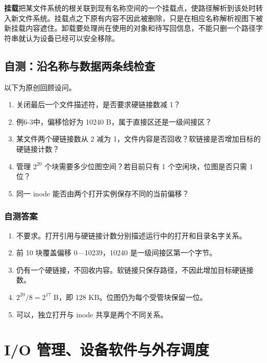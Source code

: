 \textbf{挂载}把某文件系统的根关联到现有名称空间的一个挂载点，使路径解析到该处时转入新文件系统。挂载点之下原有内容不因此被删除，只是在相应名称解析视图下被新挂载内容遮住。卸载要处理尚在使用的对象和待写回信息，不能只删一个路径字符串就认为设备已经可以安全移除。

\section{自测：沿名称与数据两条线检查}\label{os-6-review}

以下为原创回顾设问。

\begin{enumerate}
\def\labelenumi{\arabic{enumi}.}
\tightlist
\item
  关闭最后一个文件描述符，是否要求硬链接数减 1？
\item
  例6-3中，偏移恰好为 10240 B，属于直接区还是一级间接区？
\item
  某文件两个硬链接数从 2 减为 1，文件内容是否回收？软链接是否增加目标的硬链接计数？
\item
  管理 \(2^{20}\) 个块需要多少位图空间？若目前只有 1 个空闲块，位图是否只需 1 位？
\item
  同一 inode 能否由两个打开实例保存不同的当前偏移？
\end{enumerate}

\subsection{自测答案}\label{os-c06-h186}

\begin{enumerate}
\def\labelenumi{\arabic{enumi}.}
\tightlist
\item
  不要求。打开引用与硬链接计数分别描述运行中的打开和目录名字关系。
\item
  前 10 块覆盖偏移 0---10239，10240 是一级间接区第一个字节。
\item
  仍有一个硬链接，不回收内容。软链接只保存路径，不因此增加目标硬链接数。
\item
  \(2^{20}/8=2^{17}\) B，即 128 KB。位图仍为每个受管块保留一位。
\item
  可以，独立打开与 inode 共享是两个不同关系。
\end{enumerate}

\chapter{I/O 管理、设备软件与外存调度}\label{os-ch7}

